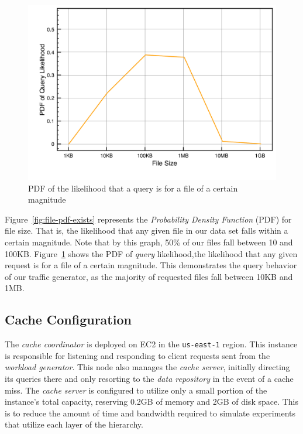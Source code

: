 \begin{figure}
\begin{center}
\includegraphics[scale=0.5]{figures/hierarchy-data-pdf-requests.pdf}
\end{center}
\caption{PDF of the likelihood that a query is for a file of a certain
magnitude}
\label{fig:file-pdf-requests}
\end{figure}

Figure~\ref{fig:file-pdf-exists} represents the \emph{Probability Density
Function} (PDF) for file size. That is, the likelihood that any given file in
our data set falls within a certain magnitude. Note that by this graph, 50\% of
our files fall between 10 and 100KB\@. Figure~\ref{fig:file-pdf-requests} shows
the PDF of \emph{query} likelihood,\ie the likelihood that any given request is
for a file of a certain magnitude. This demonstrates the query behavior of our
traffic generator, as the majority of requested files fall between 10KB and
1MB.

\subsection{Cache Configuration} %
\label{sub:cache_configuration}
The \emph{cache coordinator} is deployed on EC2 in the {\tt us-east-1} region.
This instance is responsible for listening and responding to client requests sent
from the \emph{workload generator}. This node also manages the \emph{cache
server}, initially directing its queries there and only resorting to the
\emph{data repository} in the event of a cache miss. The \emph{cache server}
is configured to utilize only a small portion of the instance's total capacity,
reserving 0.2GB of memory and 2GB of disk space. This is to reduce the amount
of time and bandwidth required to simulate experiments that utilize each layer
of the hierarchy.

